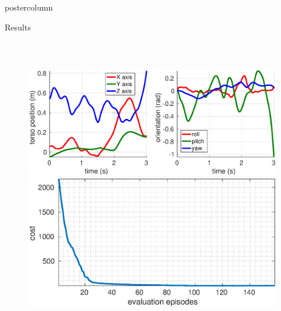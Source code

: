 \documentclass{beamer}
\begin{document}
\begin{frame}
\begin{columns}
\begin{column}{.4\textwidth}
\begin{beamercolorbox}[center]{postercolumn}
\begin{minipage}{.98\textwidth}
{\begin{myblock}{Results}
\begin{columns}
	\begin{figure}[h!]
	  \centering
\\
	  \vspace*{3mm}
	  \includegraphics[width=\linewidth]{PRec_solution_joints_1_ICRA.eps} \\
	  \vspace*{3mm}
	  \includegraphics[width=\linewidth]{PRec_solution_1_ICRA.eps}

\end{figure}
\end{columns}
\end{myblock}}
\end{minipage}
\end{beamercolorbox}
\end{column}
\end{columns}
\end{frame}
\end{document}
